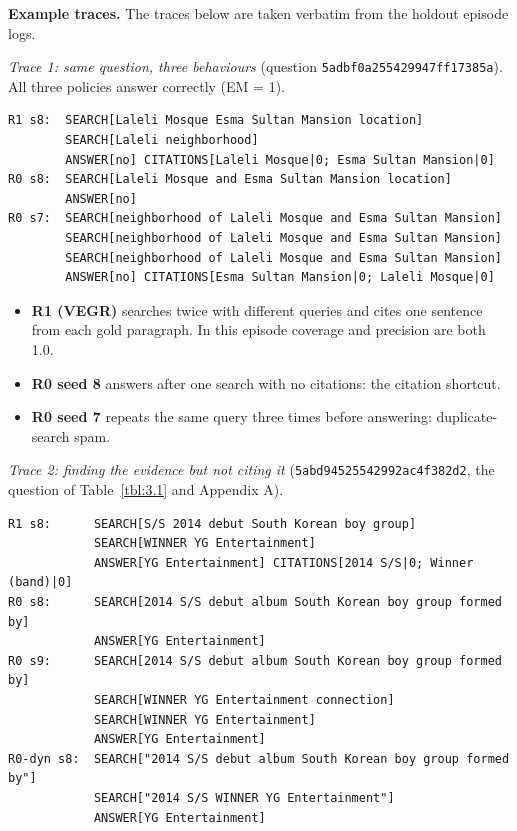 \textbf{Example traces.} The traces below are taken verbatim from the
holdout episode logs.

\emph{Trace 1: same question, three behaviours} (question
\texttt{5adbf0a255429947ff17385a}). All three policies answer correctly
(EM = 1).

\begin{Verbatim}
R1 s8:  SEARCH[Laleli Mosque Esma Sultan Mansion location]
        SEARCH[Laleli neighborhood]
        ANSWER[no] CITATIONS[Laleli Mosque|0; Esma Sultan Mansion|0]
R0 s8:  SEARCH[Laleli Mosque and Esma Sultan Mansion location]
        ANSWER[no]
R0 s7:  SEARCH[neighborhood of Laleli Mosque and Esma Sultan Mansion]
        SEARCH[neighborhood of Laleli Mosque and Esma Sultan Mansion]
        SEARCH[neighborhood of Laleli Mosque and Esma Sultan Mansion]
        ANSWER[no] CITATIONS[Esma Sultan Mansion|0; Laleli Mosque|0]
\end{Verbatim}

\begin{itemize}
\tightlist
\item
  \textbf{R1 (VEGR)} searches twice with different queries and cites one
  sentence from each gold paragraph. In this episode coverage and
  precision are both 1.0.
\item
  \textbf{R0 seed 8} answers after one search with no citations: the
  citation shortcut.
\item
  \textbf{R0 seed 7} repeats the same query three times before
  answering: duplicate-search spam.
\end{itemize}

\emph{Trace 2: finding the evidence but not citing it}
(\texttt{5abd94525542992ac4f382d2}, the question of Table~\ref{tbl:3.1}
and Appendix A).

\begin{Verbatim}
R1 s8:      SEARCH[S/S 2014 debut South Korean boy group]
            SEARCH[WINNER YG Entertainment]
            ANSWER[YG Entertainment] CITATIONS[2014 S/S|0; Winner (band)|0]
R0 s8:      SEARCH[2014 S/S debut album South Korean boy group formed by]
            ANSWER[YG Entertainment]
R0 s9:      SEARCH[2014 S/S debut album South Korean boy group formed by]
            SEARCH[WINNER YG Entertainment connection]
            SEARCH[WINNER YG Entertainment]
            ANSWER[YG Entertainment]
R0-dyn s8:  SEARCH["2014 S/S debut album South Korean boy group formed by"]
            SEARCH["2014 S/S WINNER YG Entertainment"]
            ANSWER[YG Entertainment]
\end{Verbatim}

